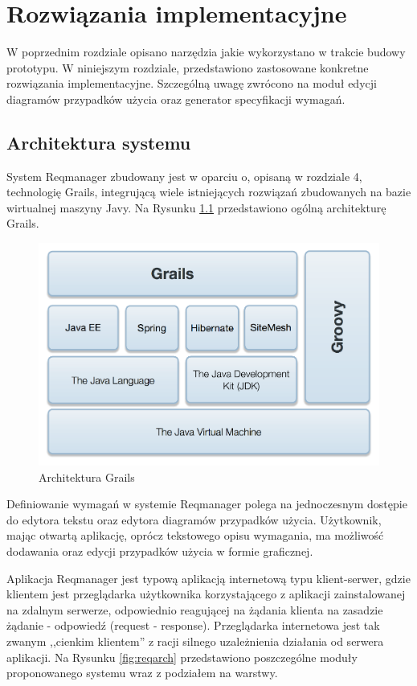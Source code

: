 \chapter{Rozwiązania implementacyjne}
  
  W poprzednim rozdziale opisano narzędzia jakie wykorzystano w trakcie budowy prototypu. W niniejszym rozdziale, przedstawiono zastosowane konkretne rozwiązania implementacyjne. Szczególną uwagę zwrócono na moduł edycji diagramów przypadków użycia oraz generator specyfikacji wymagań.

  \section{Architektura systemu}

    System Reqmanager zbudowany jest w oparciu o, opisaną w rozdziale 4, technologię Grails, integrującą wiele istniejących rozwiązań zbudowanych na bazie wirtualnej maszyny Javy. Na Rysunku \ref{fig:techstack} przedstawiono ogólną architekturę Grails.

    \begin{figure}[h]
      \centering
      \includegraphics[width=1.0\textwidth]{img/grails-stack-rev2.pdf}
      \caption{Architektura Grails}
      \label{fig:techstack}
    \end{figure}
     
    Definiowanie wymagań w systemie Reqmanager polega na jednoczesnym dostępie do edytora tekstu oraz edytora diagramów przypadków użycia. Użytkownik, mając otwartą aplikację, oprócz tekstowego opisu wymagania, ma możliwość dodawania oraz edycji przypadków użycia w formie graficznej.

    Aplikacja Reqmanager jest typową aplikacją internetową typu klient-serwer, gdzie klientem jest przeglądarka użytkownika korzystającego z aplikacji zainstalowanej na zdalnym serwerze, odpowiednio reagującej na żądania klienta na zasadzie żądanie - odpowiedź (request - response). Przeglądarka internetowa jest tak zwanym ,,cienkim klientem'' z racji silnego uzależnienia działania od serwera aplikacji. Na Rysunku \ref{fig:reqarch} przedstawiono poszczególne moduły proponowanego systemu wraz z podziałem na warstwy.
 
